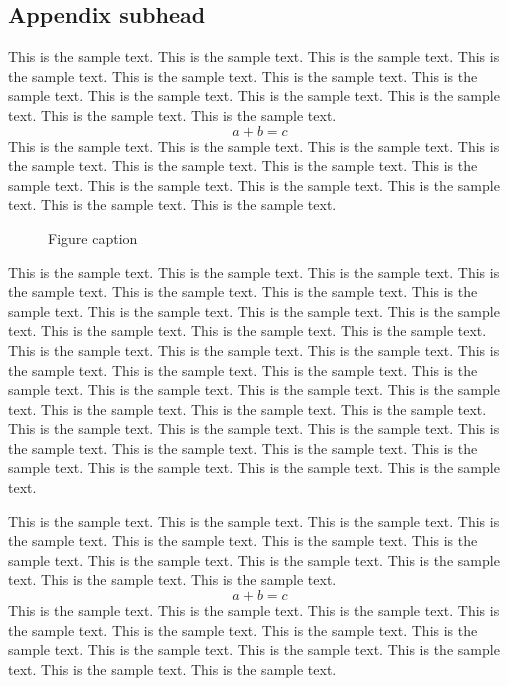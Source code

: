 \documentclass[preprint,pteplogo]{ptephy_v2}%
\begin{document}
\subsection{Appendix subhead}
This is the sample text. This is the sample text. This is the sample text. This is the sample text.
This is the sample text. This is the sample text. This is the sample text. This is the sample text.
This is the sample text. This is the sample text. This is the sample text. This is the sample text.
\begin{equation}
a + b = c
\end{equation}
This is the sample text. This is the sample text. This is the sample text. This is the sample text.
This is the sample text. This is the sample text. This is the sample text. This is the sample text.
This is the sample text. This is the sample text. This is the sample text. This is the sample text.

\begin{figure}[!h]
\caption{Figure caption}
\end{figure}

This is the sample text. This is the sample text. This is the sample text. This is the sample text.
This is the sample text. This is the sample text. This is the sample text. This is the sample text.
This is the sample text. This is the sample text. This is the sample text. This is the sample text.
This is the sample text. This is the sample text. This is the sample text. This is the sample text.
This is the sample text. This is the sample text. This is the sample text. This is the sample text.
This is the sample text. This is the sample text. This is the sample text. This is the sample text.
This is the sample text. This is the sample text. This is the sample text. This is the sample text.
This is the sample text. This is the sample text. This is the sample text. This is the sample text.
This is the sample text. This is the sample text. This is the sample text. This is the sample text.


This is the sample text. This is the sample text. This is the sample text. This is the sample text.
This is the sample text. This is the sample text. This is the sample text. This is the sample text.
This is the sample text. This is the sample text. This is the sample text. This is the sample text.
\begin{equation}
a + b = c
\end{equation}
This is the sample text. This is the sample text. This is the sample text. This is the sample text.
This is the sample text. This is the sample text. This is the sample text. This is the sample text.
This is the sample text. This is the sample text. This is the sample text. This is the sample text.
\end{document}
